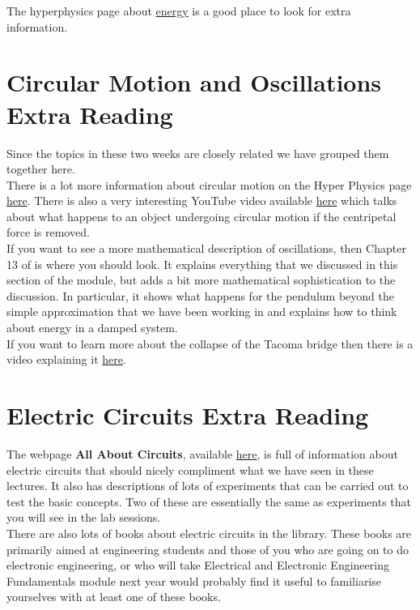 The hyperphysics page about  \href{https://hyperphysics.phy-astr.gsu.edu/hbase/enecon.html}{energy} is a good place to look for extra information.

\section{Circular Motion and Oscillations Extra Reading}
Since the topics in these two weeks are closely related we have grouped them together here. \\

There is a lot more information about circular motion on the Hyper Physics page \href{https://hyperphysics.phy-astr.gsu.edu/hbase/circ.html#circ}{here}. There is also a very interesting YouTube video available \href{https://www.youtube.com/watch?v=AL2Chc6p\_Kk\&ab\_channel=AllThingsPhysics}{here} which talks about what happens to an object undergoing circular motion if the centripetal force is removed. \\

If you want to see a more mathematical description of oscillations, then Chapter 13 of \citep{YandF2019} is where you should look. It explains everything that we discussed in this section of the module, but adds a bit more mathematical sophistication to the discussion. In particular, it shows what happens for the pendulum beyond the simple approximation that we have been working in and explains how to think about energy in a damped system. \\

If you want to learn more about the collapse of the Tacoma bridge then there is a video explaining it \href{https://www.youtube.com/watch?v=3mclp9QmCGs}{here}.

\section{Electric Circuits Extra Reading} 
The webpage \textbf{All About Circuits}, available \href{https://www.allaboutcircuits.com/textbook/}{here}, is full of information about electric circuits that should nicely compliment what we have seen in these lectures. It also has descriptions of lots of experiments that can be carried out to test the basic concepts. Two of these are essentially the same as experiments that you will see in the lab sessions. \\

There are also lots of books about electric circuits in the library. These books are primarily aimed at engineering students and those of you who are going on to do electronic engineering, or who will take Electrical and Electronic Engineering Fundamentals module next year would probably find it useful to familiarise yourselves with at least one of these books.


